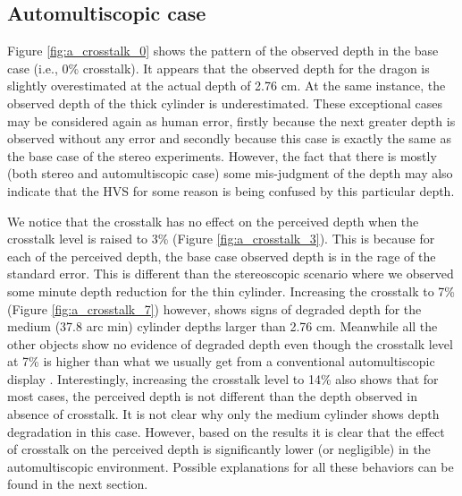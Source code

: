 \pagebreak
\subsection{Automultiscopic case}


Figure \ref{fig:a_crosstalk_0} shows the pattern of the observed depth in the base case (i.e., 0\% crosstalk). It appears that the observed depth for the dragon is slightly overestimated at the actual depth of 2.76 cm. At the same instance, the observed depth of the thick cylinder is underestimated. These exceptional cases may be considered again as human error, firstly because the next greater depth is observed without any error and secondly because this case is exactly the same as the base case of the stereo experiments. However, the fact that there is mostly (both stereo and automultiscopic case) some mis-judgment of the depth may also indicate that the HVS for some reason is being confused by this particular depth.

We notice that the crosstalk has no effect on the perceived depth when the crosstalk level is raised to 3\% (Figure \ref{fig:a_crosstalk_3}). This is because for each of the perceived depth, the base case observed depth is in the rage of the standard error. This is different than the stereoscopic scenario where we observed some minute depth reduction for the thin cylinder. Increasing the crosstalk to 7\% (Figure \ref{fig:a_crosstalk_7}) however, shows signs of degraded depth for the medium (37.8 arc min) cylinder depths larger than 2.76 cm. Meanwhile all the other objects show no evidence of degraded depth even though the crosstalk level at 7\% is higher than what we usually get from a conventional automultiscopic display \cite{woods2012crosstalk}. Interestingly, increasing the crosstalk level to 14\% also shows that for most cases, the perceived depth is not different than the depth observed in absence of crosstalk. It is not clear why only the medium cylinder shows depth degradation in this case. However, based on the results it is clear that the effect of crosstalk on the perceived depth is significantly lower (or negligible) in the automultiscopic environment. Possible explanations for all these behaviors can be found in the next section.

